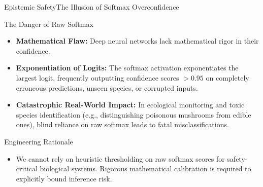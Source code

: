 \begin{frame}{Epistemic Safety}{The Illusion of Softmax Overconfidence}
    \begin{block}{The Danger of Raw Softmax}
        \begin{itemize}\small
            \item \textbf{Mathematical Flaw:} Deep neural networks lack mathematical rigor in their confidence.
            \item \textbf{Exponentiation of Logits:} The softmax activation exponentiates the largest logit, frequently outputting confidence scores $> 0.95$ on completely erroneous predictions, unseen species, or corrupted inputs.
            \item \textbf{Catastrophic Real-World Impact:} In ecological monitoring and toxic species identification (e.g., distinguishing poisonous mushrooms from edible ones), blind reliance on raw softmax leads to fatal misclassifications.
        \end{itemize}
    \end{block}

    \begin{block}{Engineering Rationale}
        \begin{itemize}\small
            \item We cannot rely on heuristic thresholding on raw softmax scores for safety-critical biological systems. Rigorous mathematical calibration is required to explicitly bound inference risk.
        \end{itemize}
    \end{block}

    \vspace{0.1cm}
    \statusdone

\end{frame}

